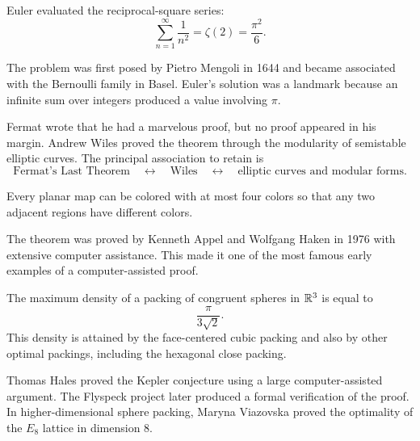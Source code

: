     \begin{theorem}
        Euler evaluated the reciprocal-square series:
        \[
            \sum_{n=1}^{\infty}\frac{1}{n^2}
            =
            \zeta(2)
            =
            \frac{\pi^2}{6}.
        \]
    \end{theorem}

    \begin{remark}
        The problem was first posed by Pietro Mengoli in 1644 and became
        associated with the Bernoulli family in Basel. Euler's solution was a
        landmark because an infinite sum over integers produced a value
        involving $\pi$.
    \end{remark}

    \begin{remark}
        Fermat wrote that he had a marvelous proof, but no proof appeared in
        his margin. Andrew Wiles proved the theorem through the modularity of
        semistable elliptic curves. The principal association to retain is
        \[
            \text{Fermat's Last Theorem}
            \quad\longleftrightarrow\quad
            \text{Wiles}
            \quad\longleftrightarrow\quad
            \text{elliptic curves and modular forms}.
        \]
    \end{remark}

    \begin{theorem}
        Every planar map can be colored with at most four colors so that any two
        adjacent regions have different colors.
    \end{theorem}

    \begin{remark}
        The theorem was proved by Kenneth Appel and Wolfgang Haken in 1976 with
        extensive computer assistance. This made it one of the most famous early
        examples of a computer-assisted proof.
    \end{remark}

    \begin{theorem}
        The maximum density of a packing of congruent spheres in $\mathbb{R}^3$ is
        equal to
        \[
            \frac{\pi}{3\sqrt{2}}.
        \]
        This density is attained by the face-centered cubic packing and also by
        other optimal packings, including the hexagonal close packing.
    \end{theorem}

    \begin{remark}
        Thomas Hales proved the Kepler conjecture using a large computer-assisted
        argument. The Flyspeck project later produced a formal verification of
        the proof. In higher-dimensional sphere packing, Maryna Viazovska proved
        the optimality of the $E_8$ lattice in dimension $8$.
    \end{remark}

